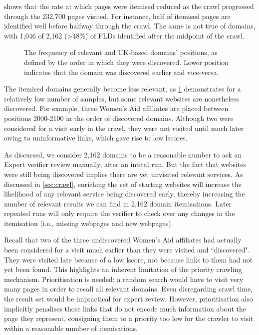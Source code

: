 \documentclass[conference]{IEEEtran}
\begin{document}
 shows that the rate at which pages were itemised reduced as the crawl progressed through the 232,700 pages visited. 
For instance, half of itemised pages are identified well before halfway through the crawl.
The same is not true of domains, with 1,046 of 2,162 (\textgreater 48\%) of FLDs identified after the midpoint of the crawl.

\begin{figure}
    \centering
    \resizebox{9cm}{!}{}
    \caption{The frequency of relevant and UK-based domains' positions, as defined by the order in which they were discovered. Lower position indicates that the domain was discovered earlier and vice-versa.}
    \label{fig:hist}
\end{figure}

The itemised domains generally become less relevant, as \cref{fig:hist} demonstrates for a relatively low number of samples, but some relevant websites are nonetheless discovered.
For example, three Women's Aid affiliates are placed between positions 2000-2100 in the order of discovered domains.
Although two were considered for a visit early in the crawl, they were not visited until much later owing to uninformative links, which gave rise to low lscores.

As discussed, we consider 2,162 domains to be a reasonable number to ask an Expert verifier review manually, after an intital run.
But the fact that websites were still being discovered implies there are yet unvisited relevant services. 
As discussed in \cref{sec:crawl}, enriching the set of starting websites will increase the likelihood of any relevant service being discovered early, thereby increasing the number of relevant results we can find in 2,162 domain itemisations.
Later repeated runs will only require the verifier to check over any changes in the itemisation (i.e., missing webpages and new webpages).


Recall that two of the three undiscovered Women's Aid affiliates had actually been considered for a visit much earlier than they were visited and ``discovered".
They were visited late because of a low lscore, not because links to them had not yet been found.
This highlights an inherent limitation of the priority crawling mechanism.
Prioritisation is needed: a random search would have to visit very many pages in order to recall all relevant domains. Even disregarding crawl time, the result set would be impractical for expert review.
However, prioritisation also implicitly penalises those links that do not encode much information about the page they represent, consigning them to a priority too low for the crawler to visit within a reasonable number of itemisations.
\end{document}
